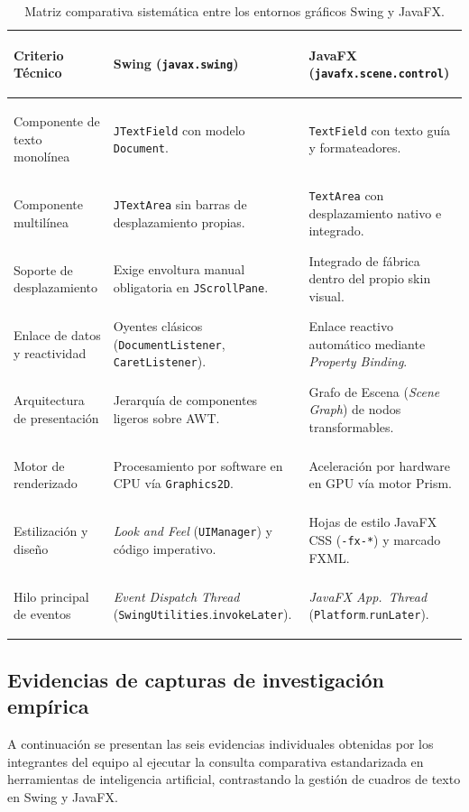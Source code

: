 \documentclass[letterpaper,12pt,oneside]{article}
\numberwithin{figure}{section}
\begin{document}
\begin{table}[htbp]
\centering
\small
\begin{tabularx}{\linewidth}{>{\bfseries\raggedright\arraybackslash}p{3.2cm} >{\raggedright\arraybackslash}X >{\raggedright\arraybackslash}X}
\toprule
Criterio Técnico & Swing (\texttt{javax.\-swing}) & JavaFX (\texttt{javafx.\-scene.\-control}) \\
\midrule
Componente de texto monolínea & \texttt{JTextField} con modelo \texttt{Document}. & \texttt{TextField} con texto guía y formateadores. \\
Componente multilínea & \texttt{JTextArea} sin barras de desplazamiento propias. & \texttt{TextArea} con desplazamiento nativo e integrado. \\
Soporte de desplazamiento & Exige envoltura manual obligatoria en \texttt{JScrollPane}. & Integrado de fábrica dentro del propio skin visual. \\
Enlace de datos y reactividad & Oyentes clásicos (\texttt{DocumentListener}, \texttt{CaretListener}). & Enlace reactivo automático mediante \textit{Property Binding}. \\
Arquitectura de presentación & Jerarquía de componentes ligeros sobre AWT. & Grafo de Escena (\textit{Scene Graph}) de nodos transformables. \\
Motor de renderizado & Procesamiento por software en CPU vía \texttt{Graphics2D}. & Aceleración por hardware en GPU vía motor Prism. \\
Estilización y diseño & \textit{Look and Feel} (\texttt{UIManager}) y código imperativo. & Hojas de estilo JavaFX CSS (\texttt{-fx-*}) y marcado FXML. \\
Hilo principal de eventos & \textit{Event Dispatch Thread} (\texttt{SwingUtilities}.\allowbreak\texttt{invokeLater}). & \textit{JavaFX App.\ Thread} (\texttt{Platform}.\allowbreak\texttt{runLater}). \\
\bottomrule
\end{tabularx}
\caption{Matriz comparativa sistemática entre los entornos gráficos Swing y JavaFX.}\label{tab:comparativa_gui}
\end{table}

\clearpage
\subsection{Evidencias de capturas de investigación empírica}
A continuación se presentan las seis evidencias individuales obtenidas por los integrantes del equipo al ejecutar la consulta comparativa estandarizada en herramientas de inteligencia artificial, contrastando la gestión de cuadros de texto en Swing y JavaFX.
\end{document}
